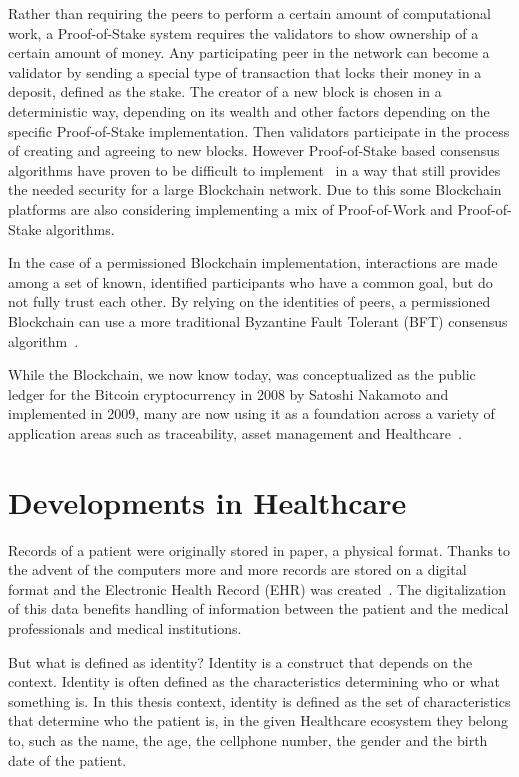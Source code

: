 Rather than requiring the peers to perform a certain amount of computational
work, a Proof-of-Stake system requires the validators to show ownership of a
certain amount of money. Any participating peer in the network can become a
validator by sending a special type of transaction that locks their money in a
deposit, defined as the stake. The creator of a new block is chosen in a
deterministic way, depending on its wealth and other factors depending on the
specific Proof-of-Stake implementation. Then validators participate in the
process of creating and agreeing to new blocks. However Proof-of-Stake based
consensus algorithms have proven to be difficult to
implement~\cite{EthereumSlasher2014} in a way that still provides the needed
security for a large Blockchain network. Due to this some Blockchain platforms
are also considering implementing a mix of Proof-of-Work and Proof-of-Stake
algorithms.

In the case of a permissioned Blockchain implementation, interactions are made
among a set of known, identified participants who have a common goal, but do
not fully trust each other. By relying on the identities of peers, a
permissioned Blockchain can use a more traditional Byzantine Fault Tolerant
(BFT) consensus algorithm~\cite{Sousa2018}.

While the Blockchain, we now know today, was conceptualized as the public
ledger for the Bitcoin cryptocurrency in 2008 by Satoshi Nakamoto and
implemented in 2009, many are now using it as a foundation across a variety of
application areas such as traceability, asset management and
Healthcare~\cite{MIT2016}.

\section{Developments in Healthcare} \label{blockchainHealthcare}

Records of a patient were originally stored in paper, a physical format.
Thanks to the advent of the computers more and more records are stored on a
digital format and the Electronic Health Record (EHR) was
created~\cite{Marquez2017}. The digitalization of this data benefits handling
of information between the patient and the medical professionals and medical
institutions\cite{ONCoordinator2017}.

But what is defined as identity? Identity is a construct that depends on the
context. Identity is often defined as the characteristics determining who or
what something is. In this thesis context, identity is defined as the set of
characteristics that determine who the patient is, in the given Healthcare
ecosystem they belong to, such as the name, the age, the cellphone number, the
gender and the birth date of the patient.  

